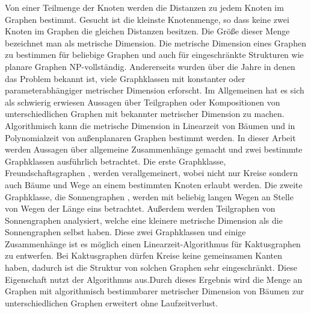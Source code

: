 Von einer Teilmenge der Knoten werden die Distanzen zu jedem Knoten im Graphen bestimmt. Gesucht ist die kleinste Knotenmenge, so dass keine zwei Knoten im Graphen die gleichen Distanzen besitzen. Die Größe dieser Menge bezeichnet man als metrische Dimension. Die metrische Dimension eines Graphen zu bestimmen für beliebige Graphen und auch für eingeschränkte Strukturen wie planare Graphen NP-vollständig.\newline\newline 
Andererseits wurden über die Jahre in denen das Problem bekannt ist, viele Graphklassen mit konstanter oder parameterabhängiger metrischer Dimension erforscht.\newline\newline 
Im Allgemeinen hat es sich als schwierig erwiesen Aussagen über Teilgraphen oder Kompositionen von unterschiedlichen Graphen mit bekannter metrischer Dimension zu machen. Algorithmisch kann die metrische Dimension in Linearzeit von Bäumen und in Polynomialzeit von außenplanaren Graphen bestimmt werden.\newline\newline
In dieser Arbeit werden Aussagen über allgemeine Zusammenhänge gemacht und zwei bestimmte Graphklassen ausführlich betrachtet.\newline\newline 
Die erste Graphklasse, Freundschaftsgraphen \cite{amal}, werden verallgemeinert, wobei nicht nur Kreise sondern auch Bäume und Wege an einem bestimmten Knoten erlaubt werden. Die zweite Graphklasse, die Sonnengraphen \cite{bases}, werden mit beliebig langen Wegen an Stelle von Wegen der Länge eins betrachtet. Außerdem werden Teilgraphen von Sonnengraphen analysiert, welche eine kleinere metrische Dimension als die Sonnengraphen selbst haben.\newline\newline 
Diese zwei Graphklassen und einige Zusammenhänge ist es möglich einen Linearzeit-Algorithmus für Kaktusgraphen zu entwerfen. Bei Kaktusgraphen dürfen Kreise keine gemeinsamen Kanten haben, dadurch ist die Struktur von solchen Graphen sehr eingeschränkt. Diese Eigenschaft nutzt der Algorithmus aus.\newline\newline Durch dieses Ergebnis wird die Menge an Graphen mit algorithmisch bestimmbarer metrischer Dimension von Bäumen zur unterschiedlichen Graphen erweitert ohne Laufzeitverlust.

